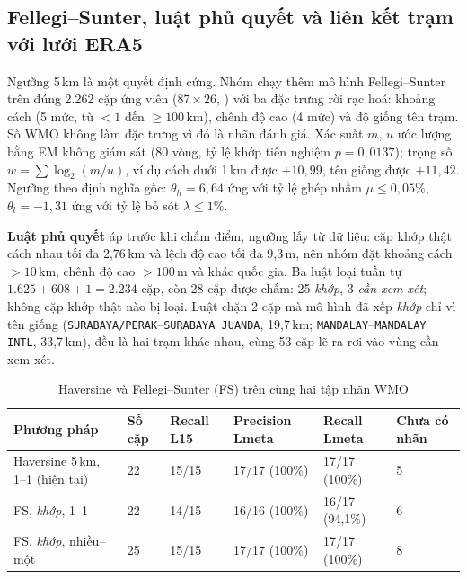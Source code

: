\documentclass[12pt,a4paper]{report}
\begin{document}
\subsection{Fellegi--Sunter, luật phủ quyết và liên kết trạm với lưới ERA5}
\label{sec:er-fs}

Ngưỡng 5\,km là một quyết định cứng. Nhóm chạy thêm mô hình Fellegi--Sunter~\cite{fellegi1969theory}
trên đúng 2.262 cặp ứng viên ($87 \times 26$, ) với ba đặc
trưng rời rạc hoá: khoảng cách (5 mức, từ $<1$ đến $\ge 100$\,km), chênh độ cao (4 mức) và độ giống
tên trạm. Số WMO không làm đặc trưng vì đó là nhãn đánh giá. Xác suất $m$, $u$ ước lượng bằng EM
không giám sát (80 vòng, tỷ lệ khớp tiên nghiệm $p = 0{,}0137$); trọng số $w = \sum\log_2(m/u)$, ví
dụ cách dưới 1\,km được $+10{,}99$, tên giống được $+11{,}42$. Ngưỡng theo định nghĩa gốc:
$\theta_h = 6{,}64$ ứng với tỷ lệ ghép nhầm $\mu \le 0{,}05\%$, $\theta_l = -1{,}31$ ứng với tỷ lệ
bỏ sót $\lambda \le 1\%$.

\textbf{Luật phủ quyết} áp trước khi chấm điểm, ngưỡng lấy từ dữ liệu: cặp khớp thật cách nhau tối
đa 2,76\,km và lệch độ cao tối đa 9,3\,m, nên nhóm đặt khoảng cách $>10$\,km, chênh độ cao $>100$\,m
và khác quốc gia. Ba luật loại tuần tự $1.625 + 608 + 1 = 2.234$ cặp, còn 28 cặp được chấm: 25
\emph{khớp}, 3 \emph{cần xem xét}; không cặp khớp thật nào bị loại. Luật chặn 2 cặp mà mô hình đã xếp
\emph{khớp} chỉ vì tên giống (\texttt{SURABAYA/PERAK}--\texttt{SURABAYA JUANDA}, 19,7\,km;
\texttt{MANDALAY}--\texttt{MANDALAY INTL}, 33,7\,km), đều là hai trạm khác nhau, cùng 53 cặp lẽ ra
rơi vào vùng cần xem xét.

\begin{table}[H]
\centering\footnotesize
\caption{Haversine và Fellegi--Sunter (FS) trên cùng hai tập nhãn WMO}
\label{tab:er-fs-compare}
\begin{tabular}{@{}L{4.6cm}R{1.0cm}R{1.4cm}R{2.3cm}R{2.3cm}R{1.3cm}@{}}
\toprule
\textbf{Phương pháp} & \textbf{Số cặp} & \textbf{Recall L15} & \textbf{Precision Lmeta} & \textbf{Recall Lmeta} & \textbf{Chưa có nhãn} \\
\midrule
Haversine 5\,km, 1--1 (hiện tại) & 22 & 15/15 & 17/17 (100\%) & 17/17 (100\%) & 5 \\
FS, \emph{khớp}, 1--1 & 22 & 14/15 & 16/16 (100\%) & 16/17 (94,1\%) & 6 \\
FS, \emph{khớp}, nhiều--một & 25 & 15/15 & 17/17 (100\%) & 17/17 (100\%) & 8 \\
\bottomrule
\end{tabular}
\end{table}
\end{document}
